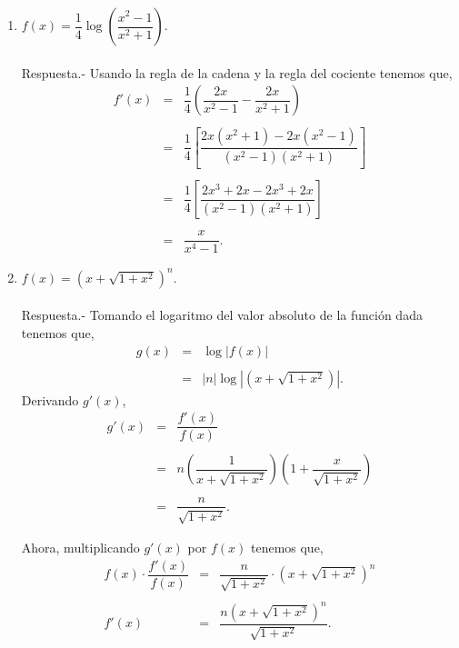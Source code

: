 \begin{enumerate}[\bfseries 1.]
    \item $f(x)=\dfrac{1}{4}\log\left(\dfrac{x^2-1}{x^2+1}\right)$.\\\\
	Respuesta.-\; Usando la regla de la cadena y la regla del cociente tenemos que,
	$$
	\begin{array}{rcl}
	    f'(x)&=&\dfrac{1}{4}\left(\dfrac{2x}{x^2-1}-\dfrac{2x}{x^2+1}\right)\\\\
		 &=& \dfrac{1}{4}\left[\dfrac{2x(x^2+1)-2x(x^2-1)}{(x^2-1)(x^2+1)}\right]\\\\
		 &=& \dfrac{1}{4}\left[\dfrac{2x^3+2x-2x^3+2x}{(x^2-1)(x^2+1)}\right]\\\\
		 &=& \dfrac{x}{x^4-1}.
	\end{array}
	$$
	\vspace{.5cm}

    \item $f(x)=(x+\sqrt{1+x^2})^n$.\\\\
	Respuesta.-\; Tomando el logaritmo del valor absoluto de la función dada tenemos que,
	$$
	\begin{array}{rcl}
	    g(x) &=& \log|f(x)|\\\\
		 &=& |n|\log\left| (x+\sqrt{1+x^2})\right|.
	\end{array}
	$$
	Derivando $g'(x)$,
	$$
	\begin{array}{rcl}
	    g'(x) &=& \dfrac{f'(x)}{f(x)}\\\\
		  &=& n\left(\dfrac{1}{x+\sqrt{1+x^2}}\right)\left(1+\dfrac{x}{\sqrt{1+x^2}}\right)\\\\
		  &=& \dfrac{n}{\sqrt{1+x^2}}.
	\end{array}
	$$

	Ahora, multiplicando $g'(x)$ por $f(x)$ tenemos que,
	$$
	\begin{array}{rcl}
	    f(x)\cdot \dfrac{f'(x)}{f(x)} &=& \dfrac{n}{\sqrt{1+x^2}}\cdot \left(x+\sqrt{1+x^2}\right)^n\\\\
	    f'(x) &=& \dfrac{n\left(x+\sqrt{1+x^2}\right)^n}{\sqrt{1+x^2}}.
	\end{array}
	$$
	\vspace{.5cm}


\end{enumerate}
